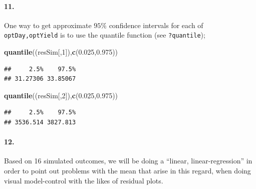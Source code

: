 \documentclass[
]{article}
\newenvironment{Shaded}{\begin{snugshade}}{\end{snugshade}}
\newcommand{\DecValTok}[1]{\textcolor[rgb]{0.00,0.00,0.81}{#1}}
\newcommand{\FloatTok}[1]{\textcolor[rgb]{0.00,0.00,0.81}{#1}}
\newcommand{\KeywordTok}[1]{\textcolor[rgb]{0.13,0.29,0.53}{\textbf{#1}}}
\newcommand{\NormalTok}[1]{#1}
\begin{document}
\hypertarget{section-60}{%
\paragraph{\texorpdfstring{\textbf{11.}}{11.}}\label{section-60}}

One way to get approximate \(95\%\) confidence intervals for each of
\texttt{optDay,optYield} is to use the quantile function (see
\texttt{?quantile});

\begin{Shaded}
\begin{Highlighting}[]
\KeywordTok{quantile}\NormalTok{((resSim[,}\DecValTok{1}\NormalTok{]),}\KeywordTok{c}\NormalTok{(}\FloatTok{0.025}\NormalTok{,}\FloatTok{0.975}\NormalTok{))}
\end{Highlighting}
\end{Shaded}

\begin{verbatim}
##     2.5%    97.5% 
## 31.27306 33.85067
\end{verbatim}

\begin{Shaded}
\begin{Highlighting}[]
\KeywordTok{quantile}\NormalTok{((resSim[,}\DecValTok{2}\NormalTok{]),}\KeywordTok{c}\NormalTok{(}\FloatTok{0.025}\NormalTok{,}\FloatTok{0.975}\NormalTok{))}
\end{Highlighting}
\end{Shaded}

\begin{verbatim}
##     2.5%    97.5% 
## 3536.514 3827.813
\end{verbatim}

\hypertarget{section-61}{%
\paragraph{\texorpdfstring{\textbf{12.}}{12.}}\label{section-61}}

Based on 16 simulated outcomes, we will be doing a ``linear,
linear-regression'' in order to point out problems with the mean that
arise in this regard, when doing visual model-control with the likes of
residual plots.
\end{document}

